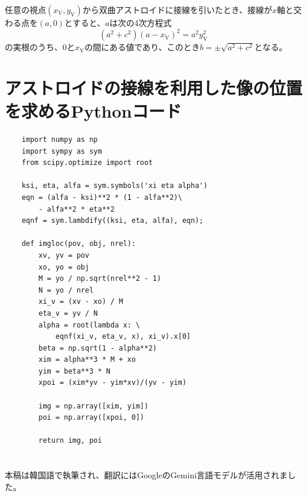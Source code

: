 \documentclass[twocolumn]{article}
\begin{document}
任意の視点$(x_{\mathrm{V}}, y_{\mathrm{V}})$から双曲アストロイドに接線を引いたとき、接線が$x$軸と交わる点を$(a,0)$とすると、$a$は次の4次方程式
$$ \left( a^2 + c^2 \right) \left(a - x_{\mathrm{V}} \right)^2 = a^2 y_{\mathrm{V}}^2$$
の実根のうち、$0$と$x_{\mathrm{V}}$の間にある値であり、このとき$b = \pm \sqrt{a^2 + c^2}$となる。

\section{アストロイドの接線を利用した像の位置を求めるPythonコード} \label{app:python}
\begin{verbatim}
	import numpy as np
	import sympy as sym
	from scipy.optimize import root
	
	ksi, eta, alfa = sym.symbols('xi eta alpha')
	eqn = (alfa - ksi)**2 * (1 - alfa**2)\
	    - alfa**2 * eta**2
	eqnf = sym.lambdify((ksi, eta, alfa), eqn);
	
	def imgloc(pov, obj, nrel):
	    xv, yv = pov
	    xo, yo = obj
	    M = yo / np.sqrt(nrel**2 - 1)
	    N = yo / nrel
	    xi_v = (xv - xo) / M
	    eta_v = yv / N
	    alpha = root(lambda x: \
	        eqnf(xi_v, eta_v, x), xi_v).x[0]
	    beta = np.sqrt(1 - alpha**2)
	    xim = alpha**3 * M + xo
	    yim = beta**3 * N
	    xpoi = (xim*yv - yim*xv)/(yv - yim)
	
	    img = np.array([xim, yim])
	    poi = np.array([xpoi, 0])
	
	    return img, poi
\end{verbatim}

\section*{}
\vfill
	

\noindent
本稿は韓国語で執筆され、翻訳にはGoogleのGemini言語モデルが活用されました。
%	
%	
	
\end{document}
